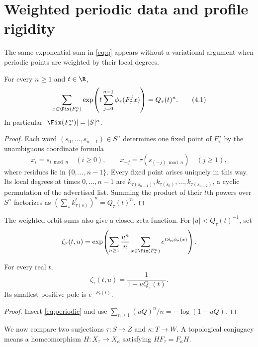 \section{Weighted periodic data and profile rigidity}\label{sec:rigidity}

The same exponential sum in \eqref{eq:q} appears without a variational
argument when periodic points are weighted by their local degrees.

\begin{proposition}\label{prop:periodic}
For every $n\geq1$ and $t\in\R$,
\[
 \sum_{x\in\Fix(F_\tau^n)}
 \exp\!\left(t\sum_{j=0}^{n-1}\phi_\tau(F_\tau^j x)\right)
 =Q_\tau(t)^n.
 \tag{4.1}\label{eq:periodic}
\]
In particular $|\Fix(F_\tau^n)|=|S|^n$.
\end{proposition}

\begin{proof}
Each word $(s_0,\ldots,s_{n-1})\in S^n$ determines one fixed point of
$F_\tau^n$ by the unambiguous coordinate formula
\[
 x_i=s_{i\bmod n}\quad(i\geq0),
 \qquad
 x_{-j}=\tau(s_{(-j)\bmod n})\quad(j\geq1),
 \tag{4.2}\label{eq:periodic-coordinates}
\]
where residues lie in $\{0,\ldots,n-1\}$.  Every fixed point arises uniquely
in this way.  Its local degrees at times $0,\ldots,n-1$ are
$k_{\tau(s_{n-1})},k_{\tau(s_0)},\ldots,k_{\tau(s_{n-2})}$, a cyclic
permutation of the advertised list.  Summing the product of their $t$th
powers over $S^n$ factorizes as
$(\sum_s k_{\tau(s)}^t)^n=Q_\tau(t)^n$.
\end{proof}

The weighted orbit sums also give a closed zeta function.  For
$|u|<Q_\tau(t)^{-1}$, set
\[
 \zeta_\tau(t,u)=\exp\!\left(
 \sum_{n\geq1}\frac{u^n}{n}
 \sum_{x\in\Fix(F_\tau^n)}e^{tS_n\phi_\tau(x)}
 \right).
\]

\begin{corollary}\label{cor:zeta}
For every real $t$,
\[
 \zeta_\tau(t,u)=\frac{1}{1-uQ_\tau(t)}.
 \tag{4.3}\label{eq:zeta}
\]
Its smallest positive pole is $e^{-P_\tau(t)}$.
\end{corollary}

\begin{proof}
Insert \eqref{eq:periodic} and use
$\sum_{n\geq1}(uQ)^n/n=-\log(1-uQ)$.
\end{proof}

We now compare two surjections $\tau:S\to Z$ and $\kappa:T\to W$.  A
topological conjugacy means a homeomorphism $H:X_\tau\to X_\kappa$ satisfying
$HF_\tau=F_\kappa H$.

